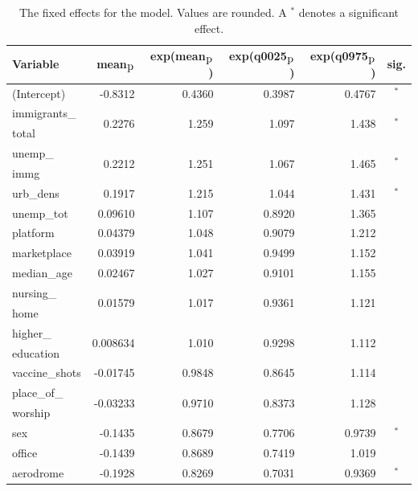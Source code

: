 \begin{table}[H]
\caption{The fixed effects for the model. Values are rounded. A $^*$ denotes a significant effect. \label{fixedAllNorway_nospatial}}
\begin{tabular}{l r r r r c}
\toprule
\textbf{Variable}	& \textbf{mean$_{\hbox{p}}$}	& \textbf{exp(mean$_{\hbox{p}}$)} & \textbf{exp(q0025$_{\hbox{p}}$)} & \textbf{exp(q0975$_{\hbox{p}}$)} & \textbf{sig.}\\
\midrule
(Intercept) & -0.8312 & 0.4360 & 0.3987 & 0.4767 & $^*$ \\
immigrants\_ & \multirow{2}{*}{0.2276}& \multirow{2}{*}{1.259}& \multirow{2}{*}{1.097}& \multirow{2}{*}{1.438}& \multirow{2}{*}{$^*$}\\
total \\
unemp\_ & \multirow{2}{*}{0.2212} & \multirow{2}{*}{1.251} & \multirow{2}{*}{1.067} & \multirow{2}{*}{1.465} & \multirow{2}{*}{$^*$} \\
immg\\
urb\_dens & 0.1917 & 1.215 & 1.044 & 1.431 & $^*$ \\
unemp\_tot & 0.09610 & 1.107 & 0.8920 & 1.365 \\
platform & 0.04379 & 1.048 & 0.9079 & 1.212 \\
marketplace & 0.03919 & 1.041 & 0.9499 & 1.152 \\
median\_age & 0.02467 & 1.027 & 0.9101 & 1.155 \\
nursing\_ & \multirow{2}{*}{0.01579} & \multirow{2}{*}{1.017} & \multirow{2}{*}{0.9361} & \multirow{2}{*}{1.121} \\
home\\
higher\_ & \multirow{2}{*}{0.008634}& \multirow{2}{*}{1.010}& \multirow{2}{*}{0.9298}& \multirow{2}{*}{1.112}\\ 
education \\
vaccine\_shots & -0.01745 & 0.9848 & 0.8645 & 1.114\\
place\_of\_ & \multirow{2}{*}{-0.03233}& \multirow{2}{*}{0.9710}& \multirow{2}{*}{0.8373}& \multirow{2}{*}{1.128} \\
worship \\
sex & -0.1435 & 0.8679 & 0.7706 & 0.9739 & $^*$ \\
office & -0.1439 & 0.8689 & 0.7419 & 1.019 \\
aerodrome & -0.1928 & 0.8269 & 0.7031 & 0.9369 & $^*$ \\
\bottomrule
\end{tabular}
\end{table}
\clearpage
